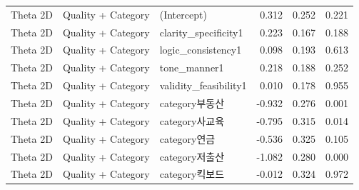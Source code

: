 \begin{tabular}{lllrrr}
  Theta 2D & Quality + Category & (Intercept) & 0.312 & 0.252 & 0.221 \\ 
  Theta 2D & Quality + Category & clarity\_specificity1 & 0.223 & 0.167 & 0.188 \\ 
  Theta 2D & Quality + Category & logic\_consistency1 & 0.098 & 0.193 & 0.613 \\ 
  Theta 2D & Quality + Category & tone\_manner1 & 0.218 & 0.188 & 0.252 \\ 
  Theta 2D & Quality + Category & validity\_feasibility1 & 0.010 & 0.178 & 0.955 \\ 
  Theta 2D & Quality + Category & category부동산 & -0.932 & 0.276 & 0.001 \\ 
  Theta 2D & Quality + Category & category사교육 & -0.795 & 0.315 & 0.014 \\ 
  Theta 2D & Quality + Category & category연금 & -0.536 & 0.325 & 0.105 \\ 
  Theta 2D & Quality + Category & category저출산 & -1.082 & 0.280 & 0.000 \\ 
  Theta 2D & Quality + Category & category킥보드 & -0.012 & 0.324 & 0.972 \\ 
   \bottomrule
\end{tabular}

